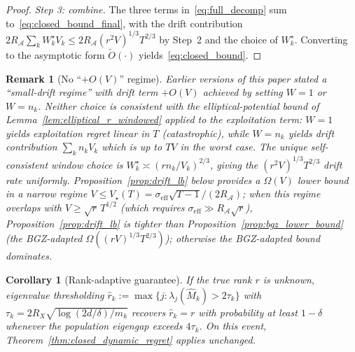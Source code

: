 \documentclass[11pt]{article}
\newcommand{\cA}{\mathcal{A}}
\newtheorem{corollary}{Corollary}
\newtheorem{remark}{Remark}
\begin{document}
\begin{proof}
\medskip
\emph{Step 3: combine.}
The three terms in~\eqref{eq:full_decomp} sum to~\eqref{eq:closed_bound_final},
with the drift contribution $2R_\cA\sum_k W_k^\star V_k\le 2R_\cA(r^2V)^{1/3}T^{2/3}$
by Step~2 and the choice of $W_k^\star$.  Converting to the asymptotic form
$\widetilde O(\cdot)$ yields~\eqref{eq:closed_bound}.
\end{proof}

\begin{remark}[No ``$+O(V)$'' regime]
\label{rem:no_OV_regime}
Earlier versions of this paper stated a ``small-drift regime'' with drift term
$+O(V)$ achieved by setting $W=1$ or $W=n_k$.  Neither choice is consistent
with the elliptical-potential bound of Lemma~\ref{lem:elliptical_r_windowed}
applied to the exploitation term: $W=1$ yields exploitation regret linear in
$T$ (catastrophic), while $W=n_k$ yields drift contribution $\sum_k n_kV_k$
which is up to $TV$ in the worst case.  The unique self-consistent window
choice is $W_k^\star\asymp(rn_k/V_k)^{2/3}$, giving the $(r^2V)^{1/3}T^{2/3}$
drift rate uniformly.  Proposition~\ref{prop:drift_lb} below provides a
$\Omega(V)$ lower bound in a narrow regime
$V\le V_\star(T)=\sigma_{\mathrm{eff}}\sqrt{T-1}/(2R_\cA)$; when this regime
overlaps with $V\ge\sqrt r\,T^{1/2}$ (which requires
$\sigma_{\mathrm{eff}}\gg R_\cA\sqrt r$), Proposition~\ref{prop:drift_lb} is
tighter than Proposition~\ref{prop:bgz_lower_bound} (the BGZ-adapted
$\Omega((rV)^{1/3}T^{2/3})$); otherwise the BGZ-adapted bound dominates.
\end{remark}

\begin{corollary}[Rank-adaptive guarantee]
\label{cor:rank_adaptive}
If the true rank $r$ is unknown, eigenvalue thresholding
$\hat{r}_k:=\max\{j:\lambda_j(\widehat{M}_k)>2\tau_k\}$ with
$\tau_k=2R_X\sqrt{\log(2d/\delta)/m_k}$
recovers $\hat{r}_k=r$ with probability at least $1-\delta$ whenever the
population eigengap exceeds $4\tau_k$.
On this event, Theorem~\ref{thm:closed_dynamic_regret} applies unchanged.
\end{corollary}
\end{document}
